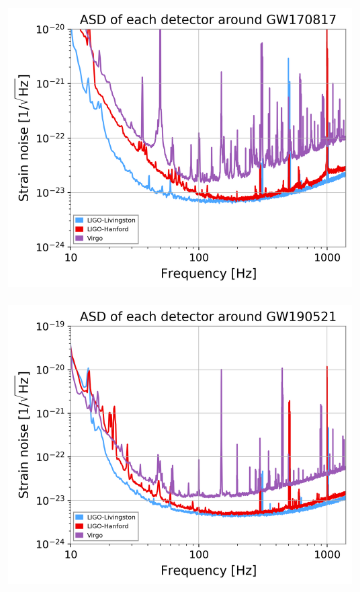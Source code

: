 \begin{figure}[htb]
    \centering
    \begin{subfigure}{0.45\textwidth}
       \centering
       \includegraphics[width=1.0\linewidth]{GWanalysisProject_codefile/asd_plot/GW170817asd.png}
       \label{fig: gw170817asd}
    \end{subfigure}
    \hfill
    \begin{subfigure}{0.45\textwidth}
        \centering
        \includegraphics[width=1.0\linewidth]{GWanalysisProject_codefile/asd_plot/GW190521asd.png}
        \label{fig: gw190814asd}

\end{subfigure}
\end{figure}
